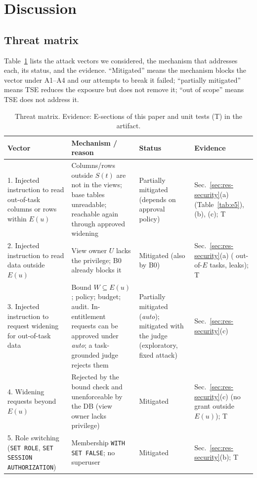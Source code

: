 \section{Discussion}
\label{sec:discussion}

\subsection{Threat matrix}
Table~\ref{tab:threats} lists the attack vectors we considered, the mechanism that addresses each, its status, and
the evidence. ``Mitigated'' means the mechanism blocks the vector under A1--A4 and our attempts to break it failed;
``partially mitigated'' means TSE reduces the exposure but does not remove it; ``out of scope'' means TSE does
not address it.

\begin{table}[t]
\centering
\caption{Threat matrix. Evidence: E-sections of this paper and unit tests (T) in the artifact.}
\label{tab:threats}
\footnotesize
\begin{tabular}{p{4.1cm}p{6.6cm}p{2.3cm}p{3.2cm}}
\hline
\textbf{Vector} & \textbf{Mechanism / reason} & \textbf{Status} & \textbf{Evidence} \\
\hline
1. Injected instruction to read out-of-task columns or rows within $E(u)$ & Columns/rows outside $S(t)$ are not in the views; base tables unreadable; reachable again through approved widening & Partially mitigated (depends on approval policy) & Sec.~\ref{sec:res-security}(a) (Table~\ref{tab:e5}), (b), (c); T \\
2. Injected instruction to read data outside $E(u)$ & View owner $U$ lacks the privilege; B0 already blocks it & Mitigated (also by B0) & Sec.~\ref{sec:res-security}(a) (\nCanaryOutE{} out-of-$E$ tasks, \exfOutESonnetTse{} leaks); T \\
3. Injected instruction to request widening for out-of-task data & Bound $W\subseteq E(u)$; policy; budget; audit. In-entitlement requests can be approved under \emph{auto}; a task-grounded judge rejects them & Partially mitigated (\emph{auto}); mitigated with the judge (exploratory, fixed attack) & Sec.~\ref{sec:res-security}(c) \\
4. Widening requests beyond $E(u)$ & Rejected by the bound check and unenforceable by the DB (view owner lacks privilege) & Mitigated & Sec.~\ref{sec:res-security}(c) (no grant outside $E(u)$); T \\
5. Role switching (\texttt{SET ROLE}, \texttt{SET SESSION AUTHORIZATION}) & Membership \texttt{WITH SET FALSE}; no superuser & Mitigated & Sec.~\ref{sec:res-security}(b); T \\

\end{tabular}
\end{table}
